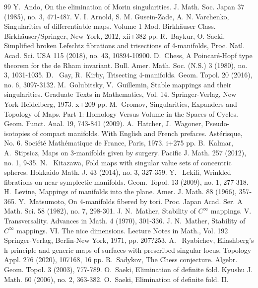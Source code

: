 \documentclass[12pt]{amsart}
\theoremstyle{definition}
\begin{document}
{\begin{thebibliography}{99}
 Y.~Ando,  On the elimination of Morin singularities. J. Math. Soc. Japan 37 (1985), no. 3, 471-487.
  V. I. Arnold, S. M. Gusein-Zade, A. N. Varchenko, Singularities of differentiable maps. Volume 1
Mod. Birkh\"auser Class. Birkh\"auser/Springer, New York, 2012, xii+382 pp.
 R.~Baykur, O. Saeki, Simplified broken Lefschtz fibrations and trisections of 4-manifolds, Proc. Natl. Acad. Sci. USA 115 (2018), no. 43, 10894-10900. 
 D.~Chess, 
A Poincar\'e-Hopf type theorem for the de Rham invariant.
Bull. Amer. Math. Soc. (N.S.) 3 (1980), no. 3, 1031-1035.
 D.~ Gay,  R.~Kirby, 
Trisecting 4-manifolds. 
Geom. Topol. 20 (2016), no. 6, 3097-3132.
 M.~Golubitsky, V.~Guillemin,  Stable mappings and their singularities. Graduate Texts in Mathematics, Vol. 14. Springer-Verlag, New York-Heidelberg, 1973. x+209 pp. 
 M.~Gromov, Singularities, Expanders and Topology of Maps. Part 1: Homology Versus Volume in the Spaces of Cycles. Geom. Funct. Anal. 19, 743-841 (2009).
 A.~Hatcher,  J.~Wagoner, 
Pseudo-isotopies of compact manifolds.
With English and French prefaces. Ast\'erisque, No. 6. Soci\'et\'e Math\'ematique de France, Paris, 1973. i+275 pp.
 B.~Kalmar, A.~Stipsicz, Maps on 3-manifolds given by surgery. Pacific J. Math. 257 (2012), no. 1, 9-35. 
 N. ~Kitazawa,
Fold maps with singular value sets of concentric spheres. 
Hokkaido Math. J. 43 (2014), no. 3, 327-359.
 Y. ~Lekili, 
Wrinkled fibrations on near-symplectic manifolds. 
Geom. Topol. 13 (2009), no. 1, 277-318.
 H.~Levine,  Mappings of manifolds into the plane. Amer. J. Math. 88 (1966), 357-365.
 Y.~Matsumoto, On 4-manifolds fibered by tori. Proc. Japan Acad. Ser. A Math. Sci. 58 (1982), no. 7, 298-301. 
 J. N.~Mather, Stability of  $C^\infty$  mappings. V. Transversality. Advances in Math. 4 (1970), 301-336.
 J. N.~Mather, Stability of  $C^\infty$  mappings. VI. The nice dimensions. Lecture Notes in Math., Vol. 192
Springer-Verlag, Berlin-New York, 1971, pp. 207?253.
 A.~ Ryabichev, 
Eliashberg's h-principle and generic maps of surfaces with prescribed singular locus. 
Topology Appl. 276 (2020), 107168, 16 pp.
 R.~Sadykov, The Chess conjecture. Algebr. Geom. Topol. 3 (2003), 777-789.
 O.~Saeki, Elimination of definite fold. Kyushu J. Math. 60 (2006), no. 2, 363-382. 
 O.~Saeki, Elimination of definite fold. II.

\end{thebibliography}}
\end{document}

